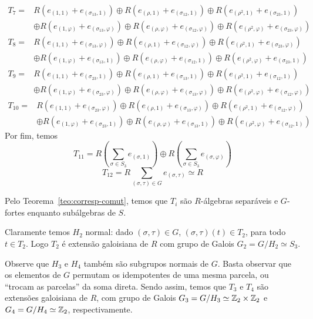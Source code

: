 \begin{exemplo}
\begin{align*}
\end{align*}
\begin{align*}
    T_7 =& R\left( e_{(1,1)} + e_{(\sigma_{13}, 1)} \right) \oplus R\left( e_{(\rho,1)} + e_{(\sigma_{12}, 1)} \right) \oplus R\left( e_{(\rho^2,1)} + e_{(\sigma_{23}, 1)} \right) \\
    &\oplus R\left( e_{(1,\varphi)} + e_{(\sigma_{13}, \varphi)} \right) \oplus R\left( e_{(\rho,\varphi)} + e_{(\sigma_{12}, \varphi)} \right) \oplus R\left( e_{(\rho^2,\varphi)} + e_{(\sigma_{23}, \varphi)} \right)
\end{align*}
\begin{align*}
    T_8 =& R\left( e_{(1,1)} + e_{(\sigma_{13}, \varphi)} \right) \oplus R\left( e_{(\rho,1)} + e_{(\sigma_{12}, \varphi)} \right) \oplus R\left( e_{(\rho^2,1)} + e_{(\sigma_{23}, \varphi)} \right) \\
    &\oplus R\left( e_{(1,\varphi)} + e_{(\sigma_{13}, 1)} \right) \oplus R\left( e_{(\rho,\varphi)} + e_{(\sigma_{12}, 1)} \right) \oplus R\left( e_{(\rho^2,\varphi)} + e_{(\sigma_{23}, 1)} \right)
\end{align*}
\begin{align*}
    T_9 =& R\left( e_{(1,1)} + e_{(\sigma_{23}, 1)} \right) \oplus R\left( e_{(\rho,1)} + e_{(\sigma_{13}, 1)} \right) \oplus R\left( e_{(\rho^2,1)} + e_{(\sigma_{12}, 1)} \right) \\
    &\oplus R\left( e_{(1,\varphi)} + e_{(\sigma_{23}, \varphi)} \right) \oplus R\left( e_{(\rho,\varphi)} + e_{(\sigma_{13}, \varphi)} \right) \oplus R\left( e_{(\rho^2,\varphi)} + e_{(\sigma_{12}, \varphi)} \right)
\end{align*}
\begin{align*}
    T_{10} =& R\left( e_{(1,1)} + e_{(\sigma_{23}, \varphi)} \right) \oplus R\left( e_{(\rho,1)} + e_{(\sigma_{13}, \varphi)} \right) \oplus R\left( e_{(\rho^2,1)} + e_{(\sigma_{12}, \varphi)} \right) \\
    &\oplus R\left( e_{(1,\varphi)} + e_{(\sigma_{23}, 1)} \right) \oplus R\left( e_{(\rho,\varphi)} + e_{(\sigma_{13}, 1)} \right) \oplus R\left( e_{(\rho^2,\varphi)} + e_{(\sigma_{12}, 1)} \right)
\end{align*}
Por fim, temos
\[T_{11} = R\left( \sum_{\sigma \in S_3} e_{(\sigma,1)}\right) \oplus R\left( \sum_{\sigma \in S_3} e_{(\sigma,\varphi)}\right)\]
\[T_{12} = R\sum_{(\sigma,\tau) \in G}e_{(\sigma,\tau)} \simeq R\]


Pelo Teorema~\ref{teo:corresp-comut}, temos que $T_i$ são $R$-álgebras separáveis e $G$-fortes enquanto subálgebras de $S$.

Claramente temos $H_2$ normal: dado $(\sigma,\tau) \in G$, $(\sigma, \tau)(t) \in T_2$, para todo $t\in T_2$. Logo $T_2$ é extensão galoisiana de $R$ com grupo de Galois $G_2 = G/H_2 \simeq S_3$.

Observe que $H_3$ e $H_4$ também são subgrupos normais de $G$. Basta observar que os elementos de $G$ permutam os idempotentes de uma mesma parcela, ou ``trocam as parcelas'' da soma direta. Sendo assim, temos que $T_3$ e $T_4$ são extensões galoisiana de $R$, com grupo de Galois $G_3 = G/H_3 \simeq \mathbb{Z}_2\times\mathbb{Z}_2$ e $G_4 = G/H_4 \simeq \mathbb{Z}_2$, respectivamente.
\end{exemplo}

